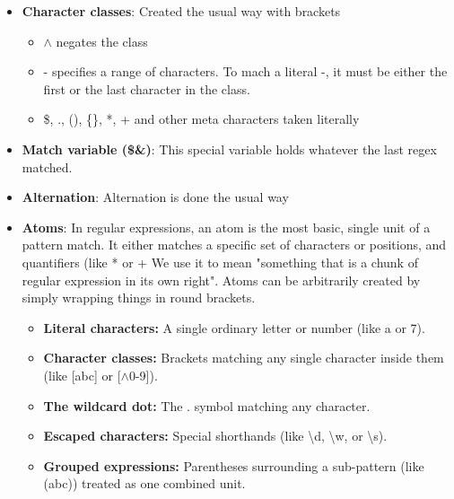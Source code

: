 \documentclass{report}
\begin{document}
\begin{itemize}
\begin{itemize}
                \item \{n,\} match n or more times
                \item \{n,m\} match between n and m times
            \end{itemize}
        \item \textbf{Character classes}: Created the usual way with brackets
            \begin{itemize}
                \item $\land$ negates the class
                \item - specifies a range of characters. To mach a literal -, it must be either the first or the last character in the class.
                \item \$, ., (), \{\}, *, + and other meta characters taken literally
            \end{itemize}
        \item \textbf{Match variable (\$\&)}: This special variable holds whatever the last regex matched.
        \item \textbf{Alternation}: Alternation is done the usual way
            \bigbreak \noindent 
        \item \textbf{Atoms}: In regular expressions, an atom is the most basic, single unit of a pattern match. It either matches a specific set of characters or positions, and quantifiers (like * or +
            \bigbreak \noindent 
            We use it to mean "something that is a chunk of regular expression in its own right". Atoms can be arbitrarily created by simply wrapping things in round brackets.
            \begin{itemize}
                \item \textbf{Literal characters:} A single ordinary letter or number (like a or 7).
                \item \textbf{Character classes:} Brackets matching any single character inside them (like [abc] or [$\land$0-9]).
                \item \textbf{The wildcard dot:} The . symbol matching any character.
                \item \textbf{Escaped characters:} Special shorthands (like \textbackslash d, \textbackslash w, or \textbackslash s).
                \item \textbf{Grouped expressions:} Parentheses surrounding a sub-pattern (like (abc)) treated as one combined unit.

\end{itemize}
\end{itemize}
\end{document}

